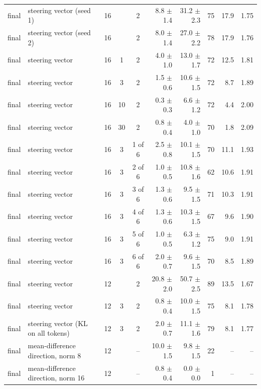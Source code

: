 \begin{longtable}{@{}lp{3.0cm}cccrrrrr@{}}
final & steering vector (seed 1) & 16 &  & 2 & 8.8 {\scriptsize$\pm$1.4} & 31.2 {\scriptsize$\pm$2.3} & 75 & 17.9 & 1.75 \\
final & steering vector (seed 2) & 16 &  & 2 & 8.0 {\scriptsize$\pm$1.4} & 27.0 {\scriptsize$\pm$2.2} & 78 & 17.9 & 1.76 \\
final & steering vector & 16 & 1 & 2 & 4.0 {\scriptsize$\pm$1.0} & 13.0 {\scriptsize$\pm$1.7} & 72 & 12.5 & 1.81 \\
final & steering vector & 16 & 3 & 2 & 1.5 {\scriptsize$\pm$0.6} & 10.6 {\scriptsize$\pm$1.5} & 72 & 8.7 & 1.89 \\
final & steering vector & 16 & 10 & 2 & 0.3 {\scriptsize$\pm$0.3} & 6.6 {\scriptsize$\pm$1.2} & 72 & 4.4 & 2.00 \\
final & steering vector & 16 & 30 & 2 & 0.8 {\scriptsize$\pm$0.4} & 4.0 {\scriptsize$\pm$1.0} & 70 & 1.8 & 2.09 \\
final & steering vector & 16 & 3 & 1 of 6 & 2.5 {\scriptsize$\pm$0.8} & 10.1 {\scriptsize$\pm$1.5} & 70 & 11.1 & 1.93 \\
final & steering vector & 16 & 3 & 2 of 6 & 1.0 {\scriptsize$\pm$0.5} & 10.8 {\scriptsize$\pm$1.6} & 62 & 10.6 & 1.91 \\
final & steering vector & 16 & 3 & 3 of 6 & 1.3 {\scriptsize$\pm$0.6} & 9.5 {\scriptsize$\pm$1.5} & 71 & 10.3 & 1.91 \\
final & steering vector & 16 & 3 & 4 of 6 & 1.3 {\scriptsize$\pm$0.6} & 10.3 {\scriptsize$\pm$1.5} & 67 & 9.6 & 1.90 \\
final & steering vector & 16 & 3 & 5 of 6 & 1.0 {\scriptsize$\pm$0.5} & 6.3 {\scriptsize$\pm$1.2} & 75 & 9.0 & 1.91 \\
final & steering vector & 16 & 3 & 6 of 6 & 2.0 {\scriptsize$\pm$0.7} & 9.6 {\scriptsize$\pm$1.5} & 70 & 8.5 & 1.89 \\
final & steering vector & 12 &  & 2 & 20.8 {\scriptsize$\pm$2.0} & 50.7 {\scriptsize$\pm$2.5} & 89 & 13.5 & 1.67 \\
final & steering vector & 12 & 3 & 2 & 0.8 {\scriptsize$\pm$0.4} & 10.0 {\scriptsize$\pm$1.5} & 75 & 8.1 & 1.78 \\
final & steering vector (KL on all tokens) & 12 & 3 & 2 & 2.0 {\scriptsize$\pm$0.7} & 11.1 {\scriptsize$\pm$1.6} & 79 & 8.1 & 1.77 \\
final & mean-difference direction, norm 8 & 12 &  & -- & 10.0 {\scriptsize$\pm$1.5} & 9.8 {\scriptsize$\pm$1.5} & 22 & -- & -- \\
final & mean-difference direction, norm 16 & 12 &  & -- & 0.8 {\scriptsize$\pm$0.4} & 0.0 {\scriptsize$\pm$0.0} & 1 & -- & -- \\

\end{longtable}
